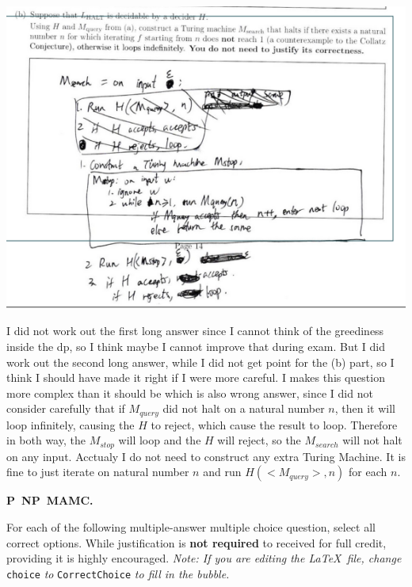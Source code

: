 \documentclass[11pt,addpoints,answers]{exam}
\newcommand{\NP}{\textsf{NP}}
\renewcommand{\P}{\textsf{P}}
\begin{document}
\begin{questions}
  \begin{solution}
    \begin{center}
      \includegraphics[scale=0.7]{1.png}\\
    \end{center}
    I did not work out the first long answer since I cannot think of the greediness inside the dp, so I think maybe I cannot improve that during exam. But I did work out the second long answer, while I did not get point for the (b) part, so I think I should have made it right if I were more careful. I makes this question more complex than it should be which is also wrong answer, since I did not consider carefully that if $M_{query}$ did not halt on a natural number $n$, then it will loop infinitely, causing the $H$ to reject, which cause the result to loop. Therefore in both way, the $M_{stop}$ will loop and the $H$ will reject, so the $M_{search}$ will not halt on any input. Acctualy I do not need to construct any extra Turing Machine. It is fine to just iterate on natural number $n$ and run $H(<M_{query}>, n)$ for each $n$.
  \end{solution}

    \question \textbf{\P\ \NP\ MAMC.} 

    For each of the following multiple-answer multiple choice question, select all correct options. While justification is \textbf{not required} to received for full credit, providing it is highly encouraged. \textit{Note: If you are editing the \LaTeX \ file, change} \texttt{choice} \textit{to} \texttt{CorrectChoice} \textit{to fill in the bubble.}
    

\end{questions}
\end{document}
